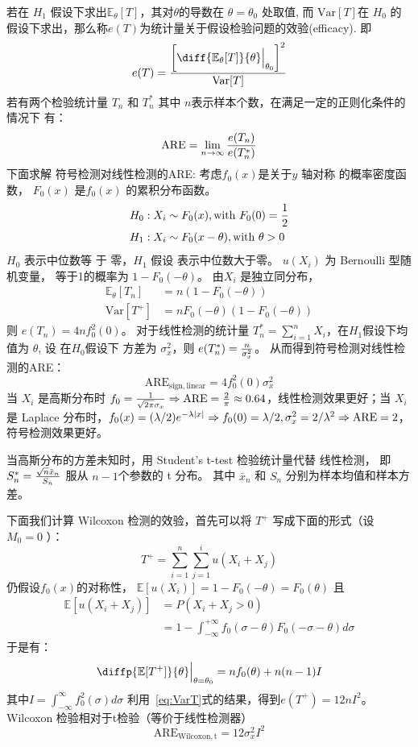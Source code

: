 \documentclass{ctexart}
\numberwithin{equation}{section}
\def\E{\mathbb{E}}
\def\Var{\textrm{Var}}
\DeclarePairedDelimiter\abs{\lvert}{\rvert}
\begin{document}
若在 $H_1$ 假设下求出$\E_{\theta}[T]$，其对$\theta $的导数在 $\theta = \theta_0$ 处取值, 而 $\Var[T]$在 $H_0$
的假设下求出，那么称$e(T)$为统计量关于假设检验问题的效验(efficacy).
即
\begin{equation}
   e(T) = { \left[ \diff{\E_{\theta}[T]}{\theta}\Big\vert_{\theta_0}\right]^2\over \Var[T]}
\end{equation}
若有两个检验统计量 $T_n$ 和 $T_n^*$ 其中 $n$表示样本个数，在满足一定的正则化条件的
情况下 有：
\begin{equation}
\mathrm{ARE} = \lim_{n\to\infty} {e(T_n) \over e(T_n^*)}
\end{equation}
下面求解 符号检测对线性检测的ARE:
考虑$f_0(x)$是关于$y$ 轴对称 的概率密度函数， $F_0(x)$ 是$f_0(x)$ 的累积分布函数。
\begin{align}
H_0 & : X_i \sim F_0(x), \textrm{with } F_0(0) = {1 \over 2} \nonumber \\
H_1 & :X_i \sim F_0(x - \theta), \textrm{with } \theta > 0
\end{align}
$H_0$ 表示中位数等 于 零，$H_1$ 假设 表示中位数大于零。
$u(X_i)$ 为 Bernoulli 型随机变量， 等于1的概率为 $ 1 - F_0(-\theta) $。
由$X_i$ 是独立同分布，
\begin{align*}
\E_{\theta}[T_n] & = n(1 - F_0(-\theta))\\
\Var[T^+] & = n F_0(-\theta)(1 - F_0(-\theta))
\end{align*}
则 $ e(T_n) = 4nf_0^2(0)$。
对于线性检测的统计量 $T_n^* = \sum_{i=1}^n X_i$，在$H_1$假设下均值为 $\theta$, 设 在$H_0$假设下 方差为 $\sigma_x^2$，则 $e(T_n^*) = { n \over \sigma_x^2 } $。
从而得到符号检测对线性检测的ARE：
$$
\mathrm{ARE}_{\mathrm{sign,linear}} = 4f_0^2(0)\sigma_x^2
$$
当 $ X_i $ 是高斯分布时 $ f_0 = {1 \over \sqrt{2\pi}\sigma_x} \Rightarrow \mathrm{ARE} = {2 \over \pi} \approx 0.64 $，线性检测效果更好；当 $X_i $ 是 Laplace 分布时，$ f_0(x) = (\lambda/2) e^{-\lambda \abs{x}} \Rightarrow f_0(0) = \lambda/2, \sigma_x^2 = 2/\lambda^2 \Rightarrow \mathrm{ARE} = 2$，符号检测效果更好。

当高斯分布的方差未知时，用 Student's t-test 检验统计量代替 线性检测， 
即 $S_n^* = { \sqrt{n} \bar{x}_n \over S_n} $ 服从 $n-1$个参数的 t 分布。
其中 $\bar{x}_n $ 和 $S_n$ 分别为样本均值和样本方差。

下面我们计算 Wilcoxon 检测的效验，首先可以将 $T^+ $ 写成下面的形式（设 $M_0 = 0$ ）：
\begin{equation}
    T^+  = \sum_{ i = 1 }^n \sum_{ j = 1}^i u(X_i + X_j)
\end{equation}
仍假设$f_0(x)$的对称性，
$ \E[u(X_i)] = 1 - F_0(-\theta) = F_0(\theta) $
且
\begin{align*}
\E[u(X_i + X_j) ] & = P(X_i + X_j > 0) \\
& = 1 - \int_{ -\infty }^{ +\infty} f_0(\sigma - \theta) F_0( - \sigma - \theta ) d\sigma
\end{align*}
于是有：
\begin{align}
 \diffp{\E[T^+]}{\theta}\Big\vert_{\theta = \theta_0} = n f_0(\theta) + n(n-1) I
\end{align}
其中$ I = \int_{-\infty}^{\infty} f_0^2(\sigma) d\sigma $
利用~\eqref{eq:VarT}式的结果，得到$e(T^+) = 12n I^2$。
Wilcoxon 检验相对于t检验（等价于线性检测器）
$$
\mathrm{ARE}_{\mathrm{Wilcoxon,t}} = 12\sigma_x^2 I^2
$$
\end{document}
